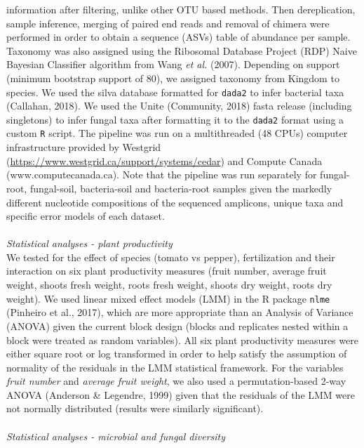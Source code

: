 \documentclass[11pt,]{article}
\begin{document}
information after filtering, unlike other OTU based methods. Then
dereplication, sample inference, merging of paired end reads and removal
of chimera were performed in order to obtain a sequence (ASVs) table of
abundance per sample. Taxonomy was also assigned using the Ribosomal
Database Project (RDP) Naive Bayesian Classifier algorithm from Wang
\emph{et al.} (2007). Depending on support (minimum bootstrap support of
80), we assigned taxonomy from Kingdom to species. We used the silva
database formatted for \texttt{dada2} to infer bacterial taxa (Callahan,
2018). We used the Unite (Community, 2018) fasta release (including
singletons) to infer fungal taxa after formatting it to the
\texttt{dada2} format using a custom \texttt{R} script. The pipeline was
run on a multithreaded (48 CPUs) computer infrastructure provided by
Westgrid (\url{https://www.westgrid.ca/support/systems/cedar}) and
Compute Canada (www.computecanada.ca). Note that the pipeline was run
separately for fungal-root, fungal-soil, bacteria-soil and bacteria-root
samples given the markedly different nucleotide compositions of the
sequenced amplicons, unique taxa and specific error models of each
dataset. ~\\
\hspace*{0.333em}\\
\emph{Statistical analyses - plant productivity}\\
We tested for the effect of species (tomato vs pepper), fertilization
and their interaction on six plant productivity measures (fruit number,
average fruit weight, shoots fresh weight, roots fresh weight, shoots
dry weight, roots dry weight). We used linear mixed effect models (LMM)
in the R package \texttt{nlme} (Pinheiro et al., 2017), which are more
appropriate than an Analysis of Variance (ANOVA) given the current block
design (blocks and replicates nested within a block were treated as
random variables). All six plant productivity measures were either
square root or log transformed in order to help satisfy the assumption
of normality of the residuals in the LMM statistical framework. For the
variables \emph{fruit number} and \emph{average fruit weight}, we also
used a permutation-based 2-way ANOVA (Anderson \& Legendre, 1999) given
that the residuals of the LMM were not normally distributed (results
were similarly significant).\\
\hspace*{0.333em}\\
\emph{Statistical analyses - microbial and fungal diversity}\\
\end{document}

